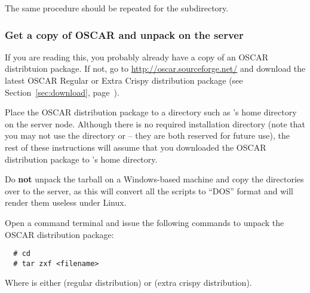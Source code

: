 The same procedure should be repeated for the
 subdirectory.

    
\subsubsection{Get a copy of OSCAR and unpack on the server} 
\label{det:unpack}

If you are reading this, you probably already have a copy of an OSCAR
distribtuion package.  If not, go to
\url{http://oscar.sourceforge.net/} and download the latest OSCAR
Regular or Extra Crispy distribution package (see
Section~\ref{sec:download}, page~\pageref{sec:download}).

Place the OSCAR distribution package to a directory such as
's home directory on the server node.  Although there is no
required installation directory (note that you may not use the
directory  or  -- they are
both reserved for future use), the rest of these instructions will
assume that you downloaded the OSCAR distribution package to
's home directory.

Do {\bf not} unpack the tarball on a Windows-based machine and copy
the directories over to the server, as this will convert all the
scripts to ``DOS'' format and will render them useless under Linux.

Open a command terminal and issue the following commands to unpack the
OSCAR distribution package:

\begin{verbatim}
  # cd
  # tar zxf <filename>
\end{verbatim}

Where  is either
 (regular distribution) or
 (extra crispy
distribution).

\def\obase{$^\sim$/oscar-\oscarversion}

